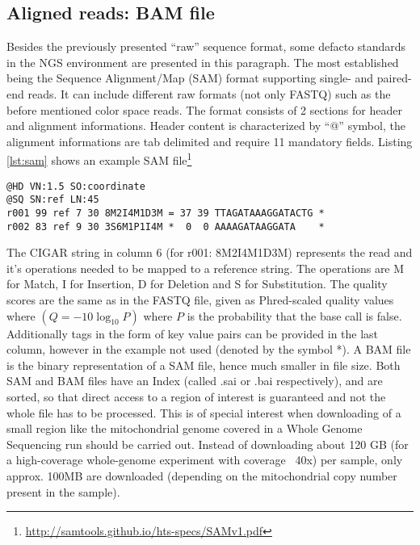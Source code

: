\subsection{Aligned reads: BAM file}
Besides the previously presented "`raw"' sequence format, some defacto standards in the NGS environment are presented in this paragraph. The most established being the Sequence Alignment/Map (SAM) format \cite{Li2009} supporting single- and paired-end reads. It can include different raw formats (not only FASTQ) such as the before mentioned color space reads. The format consists of 2 sections for header and alignment informations. Header content is characterized by "`@"' symbol, the alignment informations are tab delimited and require 11 mandatory fields. Listing \ref{lst:sam} shows an example SAM file\footnote{\url{http://samtools.github.io/hts-specs/SAMv1.pdf}} 
\begin{lstlisting}[caption= {Excerpt of a SAM file, representing two reads}, label={lst:sam}]
@HD VN:1.5 SO:coordinate
@SQ SN:ref LN:45
r001 99 ref 7 30 8M2I4M1D3M = 37 39 TTAGATAAAGGATACTG *
r002 83 ref 9 30 3S6M1P1I4M *  0  0 AAAAGATAAGGATA    *
\end{lstlisting}
The CIGAR string in column 6 (for r001: 8M2I4M1D3M) represents the read and it's operations needed to be mapped to a reference string. The operations are M for Match, I for Insertion, D for Deletion and S for Substitution. 
The quality scores are the same as in the FASTQ file, given as Phred-scaled quality values where $\left( Q=-10\log_{10} P\right)$ where $P$ is the probability that the base call is false\cite{Loman2012}. Additionally tags in the form of key value pairs can be provided in the last column, however in the example not used (denoted by the symbol *).
A BAM file is the binary representation of a SAM file, hence much smaller in file size. Both SAM and BAM files have an Index (called .sai or .bai respectively), and are sorted, so that direct access to a region of interest is guaranteed and not the whole file has to be processed. This is of special interest when downloading of a small region like the mitochondrial genome covered in a Whole Genome Sequencing run should be carried out. Instead of downloading about 120 GB (for a high-coverage whole-genome experiment with coverage ~40x) per sample, only approx. 100MB are downloaded (depending on the mitochondrial copy number present in the sample).

